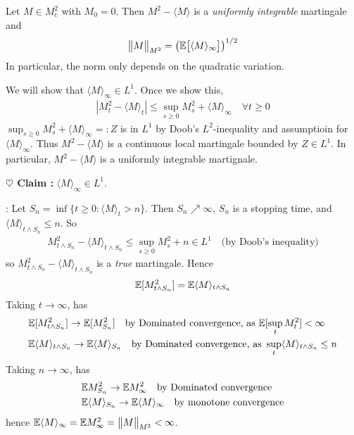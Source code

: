 \documentclass[12pt,a4paper]{article}
\newenvironment{proof}
{\begin{changemargin}{0.5cm}{0.5cm} 
	}%
	{\end{changemargin}
}
\newenvironment{subproof}
{\begin{changemargin}{0.5cm}{0.5cm} 
	}%
	{\end{changemargin}
}
\newenvironment{p}
{\begin{proof} 
	}%
	{\end{proof}
}
\begin{document}
\prop Let $M\in M^2_c$ with $M_0 =0$. Then $M^2 -\langle M \rangle$ is a \emph{uniformly integrable} martingale and
\begin{align*}
\bigl\lVert M\bigr\rVert_{M^2} = \big( \mathbb{E} \big[\langle M \rangle_{\infty} \big] \big)^{1/2}
\end{align*}
In particular, the norm only depends on the quadratic variation.
\begin{p}
\pf We will show that $\langle M \rangle_{\infty} \in L^1$. Once we show this,
\begin{align*}
|M_t^2 - \langle M \rangle_t| \leq \sup_{s\geq 0} M_s^2 + \langle M \rangle_{\infty} \quad \forall t \geq 0
\end{align*}
$\sup_{s\geq 0} M_s^2 + \langle M \rangle_{\infty} =: Z$ is in $L^1$ by Doob's $L^2$-inequality and assumptioin for $\langle M \rangle_{\infty}$. Thus $M^2 - \langle M \rangle $ is a continuous local martingale bounded by $Z \in L^1$. In particular, $M^2 - \langle M \rangle$ is a uniformly integrable martignale.
\s

\textbf{$\heartsuit$ Claim :} $\langle M \rangle_{\infty} \in L^1$.
\begin{subproof}
: Let $S_n = \inf \{ t\geq 0: \langle M \rangle_t >n \}$. Then $S_n \nearrow \infty$, $S_n$ is a stopping time, and $\langle M \rangle_{t\wedge S_n}\leq n$. So
\begin{align*}
M^2_{t\wedge S_n} - \langle M \rangle_{t\wedge S_n} \leq \sup_{s\geq 0} M_s^2 + n \in L^1 \quad \text{(by Doob's inequality)}
\end{align*}
so $M^2_{t\wedge S_n} - \langle M \rangle_{t\wedge S_n}$ is a \emph{true} martingale. Hence
\begin{align*}
\mathbb{E} [M^2_{t\wedge S_n}] = \mathbb{E} \langle M \rangle_{t\wedge S_n}
\end{align*}
Taking $t\rightarrow \infty$, has 
\begin{align*}
&\mathbb{E} [M^2_{t\wedge S_n}] \rightarrow \mathbb{E} [M^2_{S_n}] \quad \text{by Dominated convergence, as } \mathbb{E}[\sup_{t} M_t^2] < \infty \\
&\mathbb{E} \langle M\rangle_{t\wedge S_n} \rightarrow \mathbb{E} \langle M \rangle_{S_n} \quad \text{by Dominated convergence, as } \sup_t \langle M \rangle_{t\wedge S_n} \leq n 
\end{align*}
Taking $n\rightarrow \infty$, has
\begin{align*}
&\mathbb{E} M^2_{S_n} \rightarrow \mathbb{E} M^2_{\infty} \quad \text{by Dominated convergence} \\
&\mathbb{E} \langle M \rangle_{S_n} \rightarrow \mathbb{E} \langle M \rangle_{\infty} \quad \text{by monotone convergence}
\end{align*}
hence $\mathbb{E} \langle M \rangle_{\infty} = \mathbb{E} M^2_{\infty} = \bigl\lVert M\bigr\rVert_{M^2} < \infty$.
\end{subproof}
\eop
\end{p}
\end{document}
